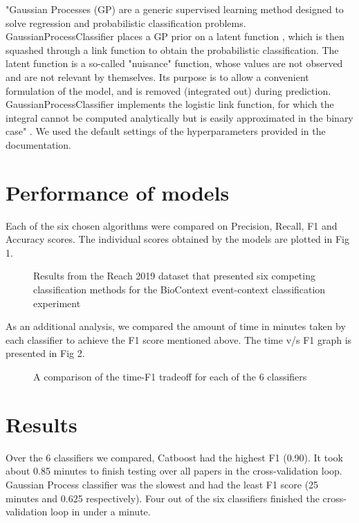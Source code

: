 \documentclass[10pt]{article}
\begin{document}
"Gaussian Processes (GP) are a generic supervised learning method designed to solve regression and probabilistic classification problems. GaussianProcessClassifier places a GP prior on a latent function , which is then squashed through a link function to obtain the probabilistic classification. The latent function is a so-called "nuisance" function, whose values are not observed and are not relevant by themselves. Its purpose is to allow a convenient formulation of the model, and  is removed (integrated out) during prediction. GaussianProcessClassifier implements the logistic link function, for which the integral cannot be computed analytically but is easily approximated in the binary case" \cite{gaussian_process_class}.
We used the default settings of the hyperparameters provided in the documentation.

\section{Performance of models}
Each of the six chosen algorithms were compared on Precision, Recall, F1 and Accuracy scores. The individual scores obtained by the models are plotted in Fig 1.
\begin{figure}[H]
    \centering

    \label{fig:figure6}
    \caption{Results from the Reach 2019 dataset that presented six competing classification methods for the BioContext event-context classification experiment}
\end{figure}


As an additional analysis, we compared the amount of time in minutes taken by each classifier to achieve the F1 score mentioned above. The time v/s F1 graph is presented in Fig 2.
\begin{figure}[H]
    \centering
    \caption{A comparison of the time-F1 tradeoff for each of the 6 classifiers}
\end{figure}



\section{Results}
Over the 6 classifiers we compared, Catboost had the highest F1 (0.90). It took about 0.85 minutes to finish testing over all papers in the cross-validation loop. Gaussian Process classifier was the slowest and had the least F1 score (25 minutes and 0.625 respectively). Four out of the six classifiers finished the cross-validation loop in under a minute.
\end{document}
